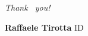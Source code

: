 \documentclass[UKenglish]{beamer}
\begin{document}
    \begin{frame}{}
        \vspace{1cm}
        \begin{center}
            \Huge{\emph{Thank ~you!}}\newline
        \end{center}
        \Large{
        \vspace{1cm}
        \textbf{Raffaele Tirotta} \hfill ID \newline
        }
    \end{frame}
\end{document}
